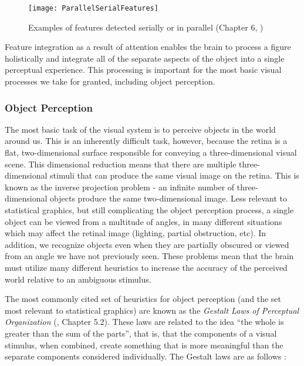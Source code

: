 \documentclass[11pt]{isuthesis}\usepackage[]{graphicx}\usepackage[]{color}
\begin{document}
\begin{figure}[htbp]\centering
\texttt{[image: ParallelSerialFeatures]}
\caption[Parallel and Serial Feature Detection]{Examples of features detected serially or in parallel (Chapter 6, \protect\citealt{helander1997handbook})}\label{fig:parallelSerialFeatures}
\end{figure}

Feature integration as a result of attention enables the brain to process a figure holistically and integrate all of the separate aspects of the object into a single perceptual experience. This processing is important for the most basic visual processes we take for granted, including object perception. 

\subsubsection{Object Perception} \label{ObjectPerception}
The most basic task of the visual system is to perceive objects in the world around us. This is an inherently difficult task, however, because the retina is a flat, two-dimensional surface responsible for conveying a three-dimensional visual scene. This dimensional reduction means that there are multiple three-dimensional stimuli that can produce the same visual image on the retina. This is known as the inverse projection problem - an infinite number of three-dimensional objects produce the same two-dimensional image. Less relevant to statistical graphics, but still complicating the object perception process, a single object can be viewed from a multitude of angles, in many different situations which may affect the retinal image (lighting, partial obstruction, etc). In addition, we recognize objects even when they are partially obscured or viewed from an angle we have not previously seen. These problems mean that the brain must utilize many different heuristics to increase the accuracy of the perceived world relative to an ambiguous stimulus. 

The most commonly cited set of heuristics for object perception (and the set most relevant to statistical graphics) are known as the \emph{Gestalt Laws of Perceptual Organization} (\citealt{goldstein}, Chapter 5.2). These laws are related to the idea ``the whole is greater than the sum of the parts'', that is, that the components of a visual stimulus, when combined, create something that is more meaningful than the separate components considered individually. The Gestalt laws are as follows \citep{goldstein}: 
\end{document}
